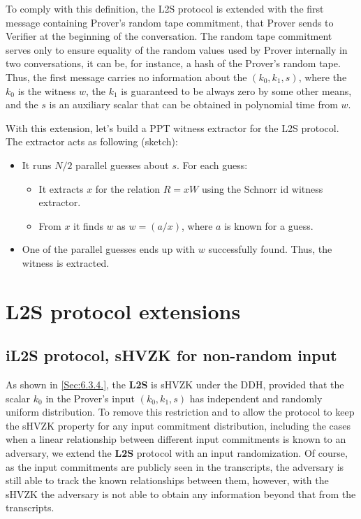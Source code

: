 \documentclass{mathcryptology} %
\theoremstyle{title}
\theoremstyle{titleof}
\begin{document}
    To comply with this definition, the L2S protocol is extended with the first message containing Prover's random tape commitment, that Prover sends to Verifier at the beginning of the conversation. The random tape commitment serves only to ensure equality of the random values used by Prover internally in two conversations, it can be, for instance, a hash of the Prover's random tape. Thus, the first message carries no information about the $(k_{0}, k_{1}, s)$, where the $k_{0}$ is the witness $w$, the $k_{1}$ is guaranteed to be always zero by some other means, and the $s$ is an auxiliary scalar that can be obtained in polynomial time from $w$. 

    With this extension, let's build a PPT witness extractor for the L2S protocol. The extractor acts as following (sketch):
    \begin{itemize}
        \item It runs $N/2$ parallel guesses about $s$. For each guess:
        \begin{itemize}
            \item It extracts $x$ for the relation $R=xW$ using the Schnorr id witness extractor.
            \item From $x$ it finds $w$ as $w=(a/x)$, where $a$ is known for a guess.
        \end{itemize}
        \item One of the parallel guesses ends up with $w$ successfully found. Thus, the witness is extracted.
    \end{itemize}


\section{L2S protocol extensions}


\subsection{iL2S protocol, sHVZK for non-random input}
    As shown in \ref{Sec:6.3.4.}, the \textbf{L2S} is sHVZK under the DDH, provided that the scalar $k_{0}$ in the Prover's input $\left(k_{0}, k_{1}, s\right)$ has independent and randomly uniform distribution.
    To remove this restriction and to allow the protocol to keep the sHVZK property for any input commitment distribution, including the cases when a linear relationship between different input commitments is known to an adversary, we extend the \textbf{L2S} protocol with an input randomization. Of course, as the input commitments are publicly seen in the transcripts, the adversary is still able to track the known relationships between them, however, with the sHVZK the adversary is not able to obtain any information beyond that from the transcripts.
\end{document}
